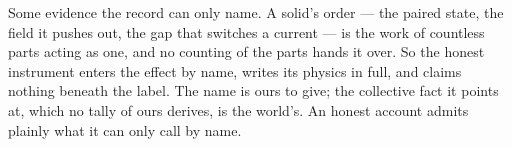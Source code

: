 %
%
%
%

\noindent Some evidence the record can only name. A solid's order --- the paired state, the field it pushes
out, the gap that switches a current --- is the work of countless parts acting as one, and no counting of the
parts hands it over. So the honest instrument enters the effect by name, writes its physics in full, and claims
nothing beneath the label. The name is ours to give; the collective fact it points at, which no tally of ours
derives, is the world's. An honest account admits plainly what it can only call by name.

